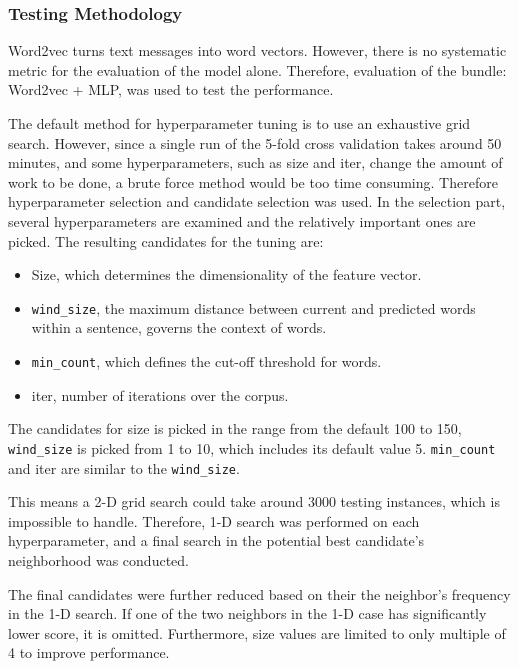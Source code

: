\documentclass[11pt,a4paper]{article}
\begin{document}
\subsubsection{Testing Methodology}
Word2vec turns text messages into word vectors. However, there is no systematic metric for the evaluation of the model alone. Therefore, evaluation of the bundle: Word2vec + MLP, was used to test the performance. \par
The default method for hyperparameter tuning is to use an exhaustive grid search. However, since a single run of the 5-fold cross validation takes around 50 minutes, and some hyperparameters, such as size and iter, change the amount of work to be done, a brute force method would be too time consuming. Therefore hyperparameter selection and candidate selection was used. In the selection part, several hyperparameters are examined and the relatively important ones are picked. The resulting candidates for the tuning are:
\begin{itemize}
	\item Size, which determines the dimensionality of the feature vector.
	\item \texttt{wind\_size}, the maximum distance between current and predicted words within a sentence, governs the context of words.
	\item \texttt{min\_count}, which defines the cut-off threshold for words.
	\item iter, number of iterations over the corpus.
\end{itemize}
The candidates for size is picked in the range from the default 100 to 150, \texttt{wind\_size} is picked from 1 to 10, which includes its default value 5. \texttt{min\_count} and iter are similar to the \texttt{wind\_size}. 
\par
This means a 2-D grid search could take around 3000 testing instances, which is impossible to handle. Therefore, 1-D search was performed on each hyperparameter, and a final search in the potential best candidate's neighborhood was conducted.
\par
The final candidates were further reduced based on their the neighbor's frequency in the 1-D search. If one of the two neighbors in the 1-D case has significantly lower score, it is omitted. Furthermore, size values are limited to only multiple of 4 to improve performance.
\end{document}
